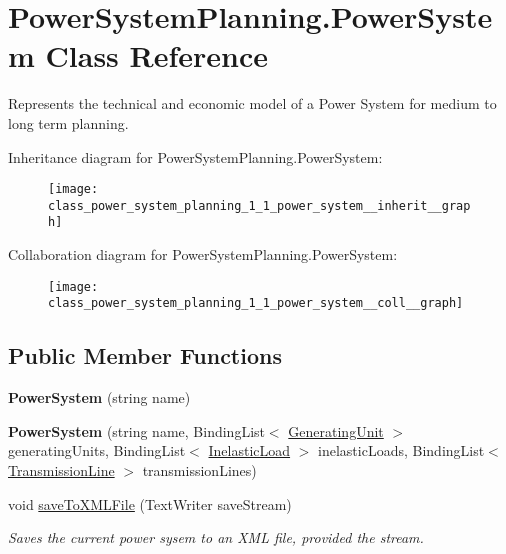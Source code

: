 \hypertarget{class_power_system_planning_1_1_power_system}{}\section{Power\+System\+Planning.\+Power\+System Class Reference}
\label{class_power_system_planning_1_1_power_system}


Represents the technical and economic model of a Power System for medium to long term planning.  




Inheritance diagram for Power\+System\+Planning.\+Power\+System\+:\nopagebreak
\begin{figure}[H]
\begin{center}
\leavevmode
\texttt{[image: class\_power\_system\_planning\_1\_1\_power\_system\_\_inherit\_\_graph]}
\end{center}
\end{figure}


Collaboration diagram for Power\+System\+Planning.\+Power\+System\+:\nopagebreak
\begin{figure}[H]
\begin{center}
\leavevmode
\texttt{[image: class\_power\_system\_planning\_1\_1\_power\_system\_\_coll\_\_graph]}
\end{center}
\end{figure}
\subsection*{Public Member Functions}
\begin{DoxyCompactItemize}
\item 
{\bfseries Power\+System} (string name)\hypertarget{class_power_system_planning_1_1_power_system_a6892a52047756c1fc3cf988695e1b787}{}\label{class_power_system_planning_1_1_power_system_a6892a52047756c1fc3cf988695e1b787}

\item 
{\bfseries Power\+System} (string name, Binding\+List$<$ \hyperlink{class_power_system_planning_1_1_generating_unit}{Generating\+Unit} $>$ generating\+Units, Binding\+List$<$ \hyperlink{class_power_system_planning_1_1_inelastic_load}{Inelastic\+Load} $>$ inelastic\+Loads, Binding\+List$<$ \hyperlink{class_power_system_planning_1_1_transmission_line}{Transmission\+Line} $>$ transmission\+Lines)\hypertarget{class_power_system_planning_1_1_power_system_a127fe1b1817e0e5b8060210dcf6490a6}{}\label{class_power_system_planning_1_1_power_system_a127fe1b1817e0e5b8060210dcf6490a6}

\item 
void \hyperlink{class_power_system_planning_1_1_power_system_a0f3c09d821634b02e79b54c82297e9f6}{save\+To\+X\+M\+L\+File} (Text\+Writer save\+Stream)
\begin{DoxyCompactList}\small\item\em Saves the current power sysem to an X\+ML file, provided the stream. \end{DoxyCompactList}\end{DoxyCompactItemize}
